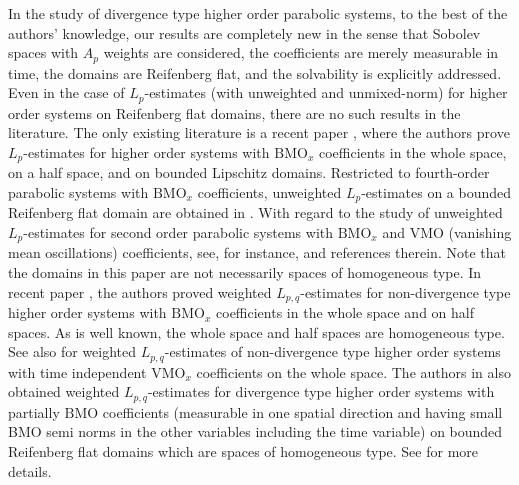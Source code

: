 \documentclass[reqno]{amsart}
\numberwithin{equation}{section}
\theoremstyle{plain}
\theoremstyle{definition}
\theoremstyle{remark}
\begin{document}
In the study of divergence type higher order parabolic systems,
to the best of the authors' knowledge, our results  are completely new  in the sense that Sobolev spaces with $A_p$ weights are considered, the coefficients are merely measurable in time, the domains are Reifenberg flat, and the solvability is explicitly addressed.
Even in the case of  $L_p$-estimates (with unweighted and unmixed-norm) for higher order systems on Reifenberg flat domains, there are no such results in the literature. 
The only existing literature is a recent paper \cite{MR2771670}, where the authors prove $L_p$-estimates for higher order systems with ${\mathrm{BMO}}_x$ coefficients  in the whole space, on a half space, and on bounded Lipschitz domains.
Restricted to fourth-order parabolic systems with ${\mathrm{BMO}}_x$ coefficients, unweighted $L_p$-estimates on a bounded Reifenberg flat domain are obtained in \cite{MR2460025}.
With regard to the study of unweighted $L_p$-estimates for second order parabolic systems with ${\mathrm{BMO}}_x$ and ${\mathrm{VMO}}$ (vanishing mean oscillations) coefficients, see, for instance, \cite{MR2328932, MR2650802} and references therein.
Note that  the domains in this paper are not necessarily spaces of homogeneous type.
In recent paper \cite{arXiv:1603.07844v1}, the authors proved weighted $L_{p,q}$-estimates for non-divergence type higher order systems with ${\mathrm{BMO}}_x$ coefficients in the whole space and on half spaces.
As is well known, the whole space and half spaces are homogeneous type.
See also \cite{MR2286441} for weighted $L_{p,q}$-estimates of non-divergence type higher order systems with time independent ${\mathrm{VMO}}_x$ coefficients on the whole space.
The authors in \cite{arXiv:1603.07844v1} also obtained weighted $L_{p,q}$-estimates for divergence type higher order systems with partially ${\mathrm{BMO}}$ coefficients (measurable in one spatial direction and having small BMO semi norms in the other variables including the time variable) on bounded Reifenberg flat domains which are spaces of homogeneous type.
See \cite[Section 7]{arXiv:1603.07844v1} for more details.
\end{document}
